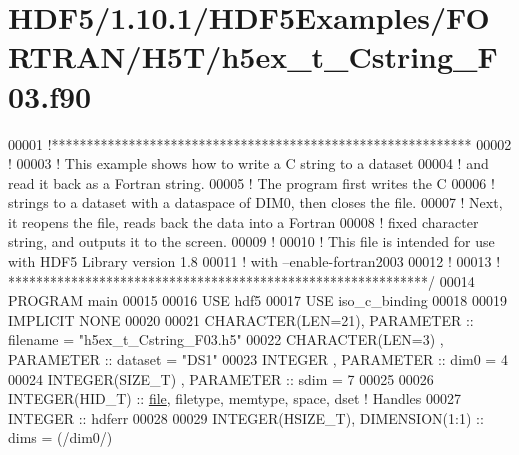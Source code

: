 \hypertarget{_h_d_f5_21_810_81_2_h_d_f5_examples_2_f_o_r_t_r_a_n_2_h5_t_2h5ex__t___cstring___f03_8f90_source}{}\section{H\+D\+F5/1.10.1/\+H\+D\+F5\+Examples/\+F\+O\+R\+T\+R\+A\+N/\+H5\+T/h5ex\+\_\+t\+\_\+\+Cstring\+\_\+\+F03.f90}
\label{_h_d_f5_21_810_81_2_h_d_f5_examples_2_f_o_r_t_r_a_n_2_h5_t_2h5ex__t___cstring___f03_8f90_source}

\begin{DoxyCode}
00001 \textcolor{comment}{!************************************************************}
00002 \textcolor{comment}{!}
00003 \textcolor{comment}{!  This example shows how to write a C string to a dataset }
00004 \textcolor{comment}{!  and read it back as a Fortran string.}
00005 \textcolor{comment}{!  The program first writes the C }
00006 \textcolor{comment}{!  strings to a dataset with a dataspace of DIM0, then closes the file.}
00007 \textcolor{comment}{!  Next, it reopens the file, reads back the data into a Fortran}
00008 \textcolor{comment}{!  fixed character string, and outputs it to the screen.}
00009 \textcolor{comment}{!}
00010 \textcolor{comment}{!  This file is intended for use with HDF5 Library version 1.8}
00011 \textcolor{comment}{!  with --enable-fortran2003 }
00012 \textcolor{comment}{!}
00013 \textcolor{comment}{! ************************************************************/}
00014 \textcolor{keyword}{PROGRAM} main
00015 
00016   \textcolor{keywordtype}{USE }hdf5
00017   \textcolor{keywordtype}{USE }iso\_c\_binding
00018 
00019   \textcolor{keywordtype}{IMPLICIT NONE}
00020 
00021   \textcolor{keywordtype}{CHARACTER(LEN=21)}, \textcolor{keywordtype}{PARAMETER} :: filename  = \textcolor{stringliteral}{"h5ex\_t\_Cstring\_F03.h5"}
00022   \textcolor{keywordtype}{CHARACTER(LEN=3)} , \textcolor{keywordtype}{PARAMETER} :: dataset   = \textcolor{stringliteral}{"DS1"}
00023   \textcolor{keywordtype}{INTEGER}          , \textcolor{keywordtype}{PARAMETER} :: dim0      = 4
00024   \textcolor{keywordtype}{INTEGER(SIZE\_T)}  , \textcolor{keywordtype}{PARAMETER} :: sdim      = 7
00025 
00026   \textcolor{keywordtype}{INTEGER(HID\_T)}  :: \hyperlink{structfile}{file}, filetype, memtype, space, dset \textcolor{comment}{! Handles}
00027   \textcolor{keywordtype}{INTEGER} :: hdferr
00028 
00029   \textcolor{keywordtype}{INTEGER(HSIZE\_T)}, \textcolor{keywordtype}{DIMENSION(1:1)}   :: dims = (/dim0/)

\end{DoxyCode}
